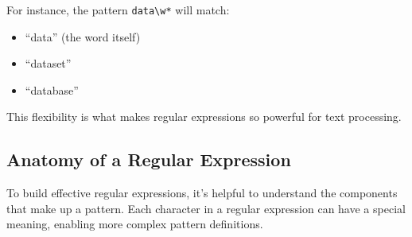 \documentclass[
  letterpaper,
  DIV=11,
  numbers=noendperiod]{scrreprt}
\providecommand{\tightlist}{%
  \setlength{\itemsep}{0pt}\setlength{\parskip}{0pt}}\usepackage{longtable,booktabs,array}
\begin{document}
For instance, the pattern \texttt{data\textbackslash{}w*} will match:

\begin{itemize}
\tightlist
\item
  ``data'' (the word itself)
\item
  ``dataset''
\item
  ``database''
\end{itemize}

This flexibility is what makes regular expressions so powerful for text
processing.

\hypertarget{anatomy-of-a-regular-expression}{%
\subsection{Anatomy of a Regular
Expression}\label{anatomy-of-a-regular-expression}}

To build effective regular expressions, it's helpful to understand the
components that make up a pattern. Each character in a regular
expression can have a special meaning, enabling more complex pattern
definitions.
\end{document}
